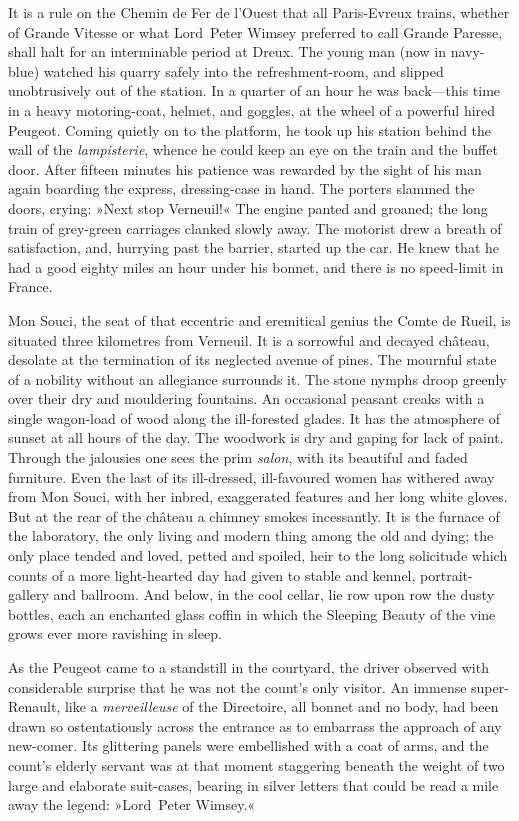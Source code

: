 \divider
It is a rule on the Chemin de Fer de l'Ouest that all Paris-Evreux trains, whether of Grande Vitesse or what Lord~Peter Wimsey preferred to call Grande Paresse, shall halt for an interminable period at Dreux. The young man (now in navy-blue) watched his quarry safely into the refreshment-room, and slipped unobtrusively out of the station. In a quarter of an hour he was back—this time in a heavy motoring-coat, helmet, and goggles, at the wheel of a powerful hired Peugeot. Coming quietly on to the platform, he took up his station behind the wall of the \textit{lampisterie}, whence he could keep an eye on the train and the buffet door. After fifteen minutes his patience was rewarded by the sight of his man again boarding the express, dressing-case in hand. The porters slammed the doors, crying: »Next stop Verneuil!« The engine panted and groaned; the long train of grey-green carriages clanked slowly away. The motorist drew a breath of satisfaction, and, hurrying past the barrier, started up the car. He knew that he had a good eighty miles an hour under his bonnet, and there is no speed-limit in France.

\divider
Mon Souci, the seat of that eccentric and eremitical genius the Comte de Rueil, is situated three kilometres from Verneuil. It is a sorrowful and decayed château, desolate at the termination of its neglected avenue of pines. The mournful state of a nobility without an allegiance surrounds it. The stone nymphs droop greenly over their dry and mouldering fountains. An occasional peasant creaks with a single wagon-load of wood along the ill-forested glades. It has the atmosphere of sunset at all hours of the day. The woodwork is dry and gaping for lack of paint. Through the jalousies one sees the prim \textit{salon}, with its beautiful and faded furniture. Even the last of its ill-dressed, ill-favoured women has withered away from Mon Souci, with her inbred, exaggerated features and her long white gloves. But at the rear of the château a chimney smokes incessantly. It is the furnace of the laboratory, the only living and modern thing among the old and dying; the only place tended and loved, petted and spoiled, heir to the long solicitude which counts of a more light-hearted day had given to stable and kennel, portrait-gallery and ballroom. And below, in the cool cellar, lie row upon row the dusty bottles, each an enchanted glass coffin in which the Sleeping Beauty of the vine grows ever more ravishing in sleep.

As the Peugeot came to a standstill in the courtyard, the driver observed with considerable surprise that he was not the count's only visitor. An immense super-Renault, like a \textit{merveilleuse} of the Directoire, all bonnet and no body, had been drawn so ostentatiously across the entrance as to embarrass the approach of any new-comer. Its glittering panels were embellished with a coat of arms, and the count's elderly servant was at that moment staggering beneath the weight of two large and elaborate suit-cases, bearing in silver letters that could be read a mile away the legend: »Lord~Peter Wimsey.«

